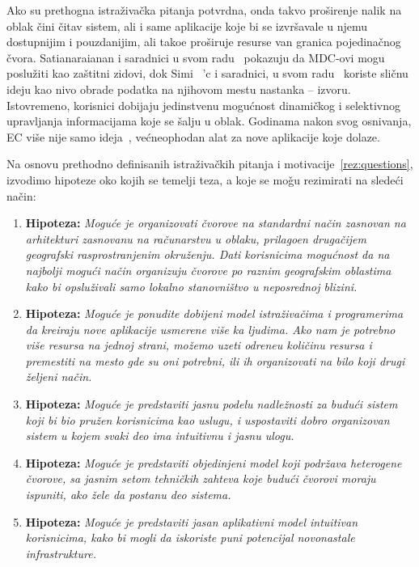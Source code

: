 Ako su prethogna istra\v ziva\v cka pitanja potvrdna, onda takvo pro\v sirenje nalik na oblak \v cini \v citav sistem, ali i same aplikacije koje bi se izvr\v savale u njemu dostupnijim i pouzdanijim, ali tako\dj e pro\v siruje resurse van granica pojedina\v cnog \v cvora. Satianaraianan i saradnici u svom radu~\cite{SatyanarayananK19} pokazuju da MDC-ovi mogu poslu\v ziti kao za\v stitni zidovi, dok Simi \ 'c i saradnici, u svom radu~\cite {inproceedingsSimic1} koriste sli\v cnu ideju kao nivo obrade podatka na njihovom mestu nastanka -- izvoru. Istovremeno, korisnici dobijaju jedinstvenu mogu\'cnost dinami\v ckog i selektivnog upravljanja informacijama koje se \v salju u oblak. Godinama nakon svog osnivanja, EC vi\v se nije samo ideja~\cite {SatyanarayananK19}, ve\'cneophodan alat za nove aplikacije koje dolaze.

Na osnovu prethodno definisanih istraživačkih pitanja i motivacije~\ref {rez:questions}, izvodimo hipoteze oko kojih se temelji teza, a koje se mo\v gu rezimirati na slede\'ci na\v cin:

\begin{enumerate}[start=1,label={(\bfseries \arabic*)}]
	\item \textbf{Hipoteza:} \textit{Mogu\'ce je organizovati \v cvorove na standardni na\v cin zasnovan na arhitekturi zasnovanu na ra\v cunarstvu u oblaku, prilago\dj en druga\v cijem geografski rasprostranjenim okruženju. Dati korisnicima mogu\'cnost da na najbolji mogu\'ci na\v cin organizuju \v cvorove po raznim geografskim oblastima kako bi opslu\v zivali samo lokalno stanovni\v stvo u neposrednoj blizini.}
	\item \textbf{Hipoteza:} \textit{Mogu\'ce je ponudite dobijeni model istra\v ziva\v cima i programerima da kreiraju nove aplikacije usmerene vi\v se ka ljudima. Ako nam je potrebno vi\v se resursa na jednoj strani, mo\v zemo uzeti odre\dj neu koli\v cinu resursa i premestiti na mesto gde su oni potrebni, ili ih organizovati na bilo koji drugi \v zeljeni na\v cin.}
	\item \textbf{Hipoteza:} \textit{Mogu\'ce je predstaviti jasnu podelu nadle\v znosti za budu\'ci sistem koji bi bio pru\v zen korisnicima kao uslugu, i uspostaviti dobro organizovan sistem u kojem svaki deo ima intuitivnu i jasnu ulogu.}
	\item \textbf{Hipoteza:} \textit{Mogu\'ce je predstaviti objedinjeni model koji podr\v zava heterogene \v cvorove, sa jasnim setom tehni\v ckih zahteva koje budu\'ci \v cvorovi moraju ispuniti, ako \v zele da postanu deo sistema.}
	\item \textbf{Hipoteza:} \textit{Mogu\'ce je predstaviti jasan aplikativni model intuitivan korisnicima, kako bi mogli da iskoriste puni potencijal novonastale infrastrukture.}
\end{enumerate}

